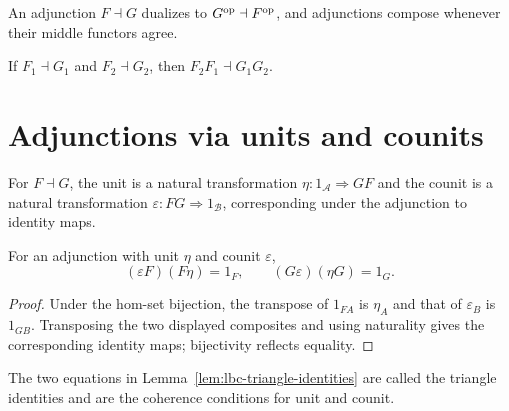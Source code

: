 \begin{remark}
\label{rem:lbc-adjunction-duality}
An adjunction $F\dashv G$ dualizes to $G^{\mathrm{op}}\dashv F^{\mathrm{op}}$, and adjunctions
compose whenever their middle functors agree.
\end{remark}

\begin{remark}
\label{rem:lbc-adjunction-composition}
If $F_1\dashv G_1$ and $F_2\dashv G_2$, then $F_2F_1\dashv G_1G_2$.
\end{remark}

\section{Adjunctions via units and counits}
\begin{definition}
\label{def:lbc-unit-counit}
For $F\dashv G$, the unit is a natural transformation
$\eta:1_{\mathcal A}\Rightarrow GF$ and the counit is a natural transformation
$\varepsilon:FG\Rightarrow1_{\mathcal B}$, corresponding under the adjunction
to identity maps.
\end{definition}

\begin{lemma}
\label{lem:lbc-triangle-identities}
For an adjunction with unit $\eta$ and counit $\varepsilon$,
\[(\varepsilon F)(F\eta)=1_F,\qquad (G\varepsilon)(\eta G)=1_G.\]
\end{lemma}
\begin{proof}
Under the hom-set bijection, the transpose of $1_{FA}$ is $\eta_A$ and that of
$\varepsilon_B$ is $1_{GB}$. Transposing the two displayed composites and using
naturality gives the corresponding identity maps; bijectivity reflects equality.
\end{proof}

\begin{remark}
\label{rem:lbc-triangle}
The two equations in Lemma~\ref{lem:lbc-triangle-identities} are called the
triangle identities and are the coherence conditions for unit and counit.
\end{remark}

